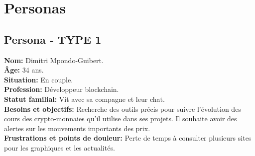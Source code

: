 \documentclass[a4paper,11pt]{article}
\begin{document}
\section{Personas}

\subsection{Persona - TYPE 1}
\begin{minipage}{0.6\textwidth} %
    \textbf{Nom:} Dimitri Mpondo-Guibert.\\
    \textbf{Âge:} 34 ans.\\
    \textbf{Situation:} En couple.\\
    \textbf{Profession:} Développeur blockchain.\\
    \textbf{Statut familial:} Vit avec sa compagne et leur chat.\\
    \textbf{Besoins et objectifs:} Recherche des outils précis pour suivre l’évolution des cours des crypto-monnaies qu’il utilise dans ses projets. Il souhaite avoir des alertes sur les mouvements importants des prix.\\
    \textbf{Frustrations et points de douleur:} Perte de temps à consulter plusieurs sites pour les graphiques et les actualités.\\
\end{minipage}%
\hspace{1cm}
\end{document}
